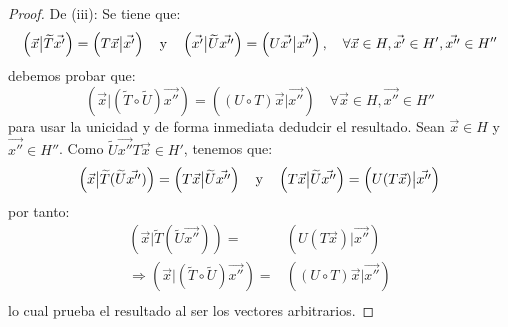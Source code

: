 \documentclass[12pt]{report}
\theoremstyle{largebreak}
\newcommand\adj[1]{\ensuremath{\widetilde{#1}}}
\newcommand\pint[2]{\ensuremath{\left(#1\big|#2\right)}}
\begin{document}
\begin{proof}
        De (iii): Se tiene que:
        \begin{equation*}
            \pint{\vec{x}}{\adj{T}\vec{x'}}=\pint{T\vec{x}}{\vec{x'}}\quad\textup{y}\quad\pint{\vec{x'}}{\adj{U}\vec{x''}}=\pint{U\vec{x'}}{\vec{x''}},\quad\forall\vec{x}\in H,\vec{x'}\in H',\vec{x''}\in H''
        \end{equation*}
        debemos probar que:
        \begin{equation*}
            \pint{\vec{x}}{(\adj{T}\circ\adj{U})\vec{x''}}=\pint{(U\circ T)\vec{x}}{\vec{x''}}\quad\forall\vec{x}\in H,\vec{x''}\in H''
        \end{equation*}
        para usar la unicidad y de forma inmediata dedudcir el resultado.
        Sean $\vec{x}\in H$ y $\vec{x''}\in H''$. Como $\adj{U}\vec{x''}T\vec{x} \in H'$, tenemos que:
        \begin{equation*}
            \pint{\vec{x}}{\adj{T}(\adj{U}\vec{x''})}=\pint{T\vec{x}}{\adj{U}\vec{x''}}\quad\textup{y}\quad\pint{T\vec{x}}{\adj{U}\vec{x''}}=\pint{U(T\vec{x})}{\vec{x''}}
        \end{equation*}
        por tanto:
        \begin{equation*}
            \begin{split}
                \pint{\vec{x}}{\adj{T}(\adj{U}\vec{x''})}=&\pint{U(T\vec{x})}{\vec{x''}}\\
                \Rightarrow \pint{\vec{x}}{(\adj{T}\circ \adj{U})\vec{x''}}=&\pint{(U\circ T)\vec{x}}{\vec{x''}}\\
            \end{split}
        \end{equation*}
        lo cual prueba el resultado al ser los vectores arbitrarios.

    \end{proof}
\end{document}
